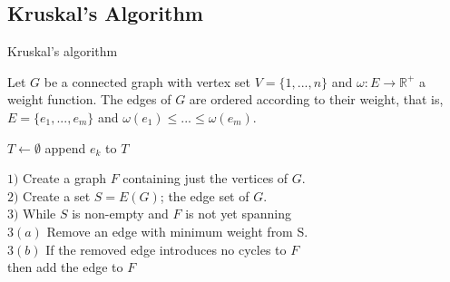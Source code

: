 \documentclass[../main.tex]{subfiles}
\begin{document}
\subsection{Kruskal's Algorithm}
\begin{algorithm}[H]
\caption{Kruskal's algorithm}\label{kruskal}
Let $G$ be a connected graph with vertex set $V = \{1,...,n\}$ and $\omega:E \longrightarrow \mathbb{R^+}$ a weight function. The edges of $G$ are ordered according to their weight, that is, $E = \{e_1,...,e_m\}$ and $\omega(e_1) \leq ... \leq \omega(e_m).$
\begin{algorithmic}[1]
\State $T\gets \emptyset$
	 	\State append $e_k$ to $T$
	\EndIf
\EndFor
\EndProcedure
\end{algorithmic}
\end{algorithm}

\begin{algorithm}
$1)$ Create a graph $F$ containing just the vertices of $G.$\\
$2)$ Create a set $S = E(G)$; the edge set of $G.$ \\
$3)$ While $S$ is non-empty and $F$ is not yet spanning\\
\hspace{5mm} $3(a)$ Remove an edge with minimum weight from S.\\
\hspace{5mm} $3(b)$ If the removed edge introduces no cycles to $F$\\
\hspace{5mm} then add the edge to $F$\\
\end{algorithm}
\end{document}
